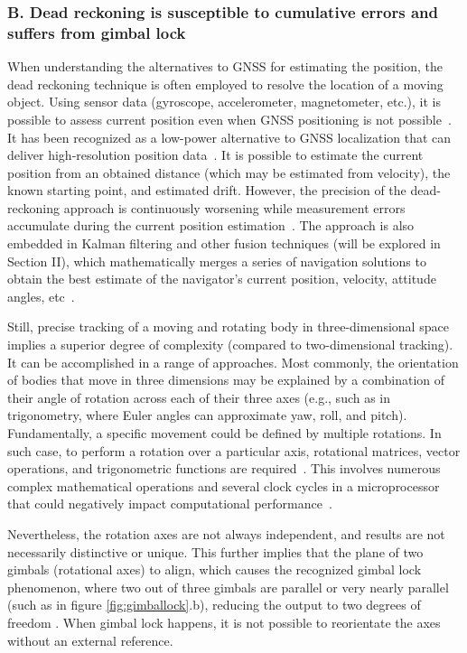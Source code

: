 \subsubsection{B. Dead reckoning is susceptible to cumulative errors and suffers from gimbal lock} %
When understanding the alternatives to GNSS for estimating the position, the dead reckoning technique is often employed to resolve the location of a moving object. Using sensor data (gyroscope, accelerometer, magnetometer, etc.), it is possible to assess current position even when GNSS positioning is not possible~\cite{omar2016integration}. It has been recognized as a low-power alternative to GNSS localization that can deliver high‐resolution position data~\cite{dewhirst2016improving}. It is possible to estimate the current position from an obtained distance (which may be estimated from velocity), the known starting point, and estimated drift. However, the precision of the dead-reckoning approach is continuously worsening while measurement errors accumulate during the current position estimation~\cite{kao1991integration}. The approach is also embedded in Kalman filtering and other fusion techniques (will be explored in Section II), which mathematically merges a series of navigation solutions to obtain the best estimate of the navigator’s current position, velocity, attitude angles, etc~\cite{krakiwsky1988kalman}.

Still, precise tracking of a moving and rotating body in three-dimensional space implies a superior degree of complexity (compared to two-dimensional tracking). It can be accomplished in a range of approaches. Most commonly, the orientation of bodies that move in three dimensions may be explained by a combination of their angle of rotation across each of their three axes (e.g., such as in trigonometry, where Euler angles can approximate yaw, roll, and pitch). Fundamentally, a specific movement could be defined by multiple rotations. In such case, to perform a rotation over a particular axis, rotational matrices, vector operations, and trigonometric functions are required~\cite{bojanczyk1991computation}. This involves numerous complex mathematical operations and several clock cycles in a microprocessor that could negatively impact computational performance~\cite{janota2015improving}.

Nevertheless, the rotation axes are not always independent, and results are not necessarily distinctive or unique. This further implies that the plane of two gimbals (rotational axes) to align, which causes the recognized gimbal lock phenomenon, where two out of three gimbals are parallel or very nearly parallel (such as in figure \ref{fig:gimballock}.b), reducing the output to two degrees of freedom \cite{hemingway2018perspectives}. When gimbal lock happens, it is not possible to reorientate the axes without an external reference.

